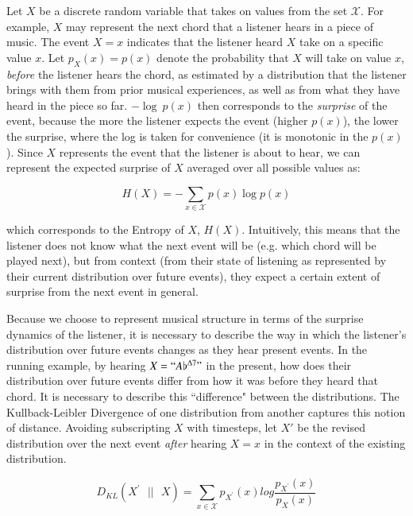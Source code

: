 \documentclass[final,authoryear,5p,times,twocolumn]{elsarticle}
\begin{document}
Let $X$ be a discrete random variable that takes on values from the set $\mathcal{X}$. For example, $X$ may represent the next chord that a listener hears in a piece of music. The event $X=x$ indicates that the listener heard $X$ take on a specific value $x$. Let $p_X(x) = p(x)$ denote the probability that $X$ will take on value $x$, \textit{before} the listener hears the chord, as estimated by a distribution that the listener brings with them from prior musical experiences, as well as from what they have heard in the piece so far. $-\log\ p(x)$ then corresponds to the \textit{surprise} of the event, because the more the listener expects the event (higher $p(x)$), the lower the surprise, where the log is taken for convenience (it is monotonic in the $p(x)$). Since $X$ represents the event that the listener is about to hear, we can represent the expected surprise of $X$ averaged over all possible values as:
 
 $$ H(X) = - \sum_{x \in \mathcal{X}} p(x) \log p(x)$$
 
\noindent which corresponds to the Entropy of $X$, $H(X)$. Intuitively, this means that the listener does not know what the next event will be (e.g. which chord will be played next), but from context (from their state of listening as represented by their current distribution over future events), they expect a certain extent of surprise from the next event in general.

Because we choose to represent musical structure in terms of the surprise dynamics of the listener, it is necessary to describe the way in which the listener's distribution over future events changes as they hear present events. In the running example, by hearing $X=``A\flat^{\Delta7}"$ in the present, how does their distribution over future events differ from how it was before they heard that chord. It is necessary to describe this ``difference" between the distributions. The Kullback-Leibler Divergence of one distribution from another captures this notion of distance. Avoiding subscripting $X$ with timesteps, let  $X'$ be the revised distribution over the next event \textit{after} hearing $X=x$ in the context of the existing distribution.

$$ D_{KL}(X^{\prime}\textrm{ }|| \textrm{ } X) =  \sum_{x \in \mathcal{X}} p_{X^{\prime}}(x) log\frac{p_{X^{\prime}}(x) }{p_{X}(x)}$$
\end{document}
